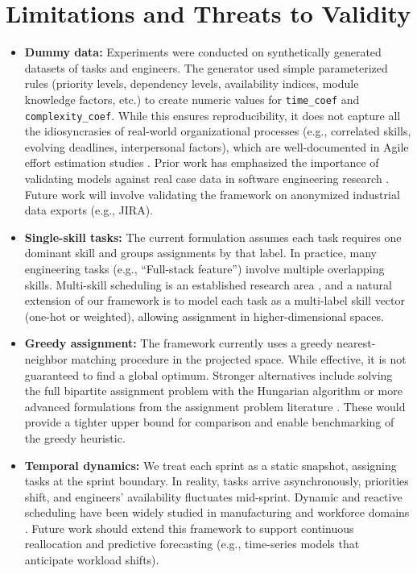 \documentclass[final,1p,times]{elsarticle}
\begin{document}
\section{Limitations and Threats to Validity}\label{sec:limits}
\begin{itemize}[leftmargin=*]
    \item \textbf{Dummy data:} Experiments were conducted on synthetically generated datasets of tasks and engineers. 
    The generator used simple parameterized rules (priority levels, dependency levels, availability indices, module knowledge factors, etc.) to create numeric values for \texttt{time\_coef} and \texttt{complexity\_coef}. 
    While this ensures reproducibility, it does not capture all the idiosyncrasies of real-world organizational processes (e.g., correlated skills, evolving deadlines, interpersonal factors), which are well-documented in Agile effort estimation studies \cite{misirli2013agileuncertainty}.
    Prior work has emphasized the importance of validating models against real case data in software engineering research \cite{RunesonHost2009}. 
    Future work will involve validating the framework on anonymized industrial data exports (e.g., JIRA). 
    
    \item \textbf{Single-skill tasks:} The current formulation assumes each task requires one dominant skill and groups assignments by that label. 
    In practice, many engineering tasks (e.g., “Full-stack feature”) involve multiple overlapping skills. 
    Multi-skill scheduling is an established research area \cite{WileyMSPSPReview2018,WorldSciMSRCPSP2019}, and a natural extension of our framework is to model each task as a multi-label skill vector (one-hot or weighted), allowing assignment in higher-dimensional spaces. 
    
    \item \textbf{Greedy assignment:} The framework currently uses a greedy nearest-neighbor matching procedure in the projected space. 
    While effective, it is not guaranteed to find a global optimum. 
    Stronger alternatives include solving the full bipartite assignment problem with the Hungarian algorithm \cite{kuhn1955hungarian} or more advanced formulations from the assignment problem literature \cite{BurkardAssignmentBook}. 
    These would provide a tighter upper bound for comparison and enable benchmarking of the greedy heuristic. 
    
    \item \textbf{Temporal dynamics:} We treat each sprint as a static snapshot, assigning tasks at the sprint boundary. 
    In reality, tasks arrive asynchronously, priorities shift, and engineers’ availability fluctuates mid-sprint. 
    Dynamic and reactive scheduling have been widely studied in manufacturing and workforce domains \cite{ReactiveSchedSurvey2006,RealTimeSchedSurvey2014,RollingHorizonSurvey2010}. 
    Future work should extend this framework to support continuous reallocation and predictive forecasting (e.g., time-series models that anticipate workload shifts).
\end{itemize}
\end{document}
